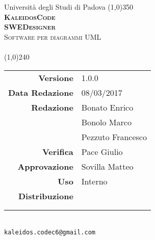 \documentclass[a4paper,12pt]{article}
\author{KaleidosCode}
\date{08/03/2017}	%
\begin{document}
	\begin{titlepage}
		\centering Università degli Studi di Padova
		\line(1,0){350}\\
		\vspace{0.4cm}
		{\bfseries\scshape\LARGE KaleidosCode\\}
		\vspace{0.4cm}
		{\bfseries\scshape\LARGE SWEDesigner\\}
		{\scshape\Large Software per diagrammi UML\\}
		\vspace{1cm}
		{\scshape\Large \studiodifattibilitai\ \\}		%
		\vspace{1.4cm}
		\logo
		\vspace{1.2cm}
		\line(1,0){240}\\
		\begin{tabular}{r|l}
			{\hfill \textbf{Versione}} 			& 1.0.0\\
			{\hfill \textbf{Data Redazione}} 	& 08/03/2017\\	%
			{\hfill \textbf{Redazione}} 		& Bonato Enrico\\ & Bonolo Marco\\ & Pezzuto Francesco\\
			{\hfill \textbf{Verifica}} 			& Pace Giulio\\
			{\hfill \textbf{Approvazione}} 		& Sovilla Matteo\\
			{\hfill \textbf{Uso}} 				& Interno\\
			{\hfill \textbf{Distribuzione}} 	& \vardanega \\ & \cardin \\ & \proponente\\
		\end{tabular}\\
		\vspace{2cm}
		\texttt{kaleidos.codec6@gmail.com}
	\end{titlepage}

	\pagestyle{myfront}
	\newpage
		
	\newpage
		\tableofcontents
	\pagestyle{mymain}
	\newpage
		
	\newpage
		
	\newpage
		
	\newpage
		
	\newpage
		
	\newpage
		
	\newpage
		
	\label{LastPage}
\end{document}
